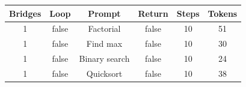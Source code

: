 \begin{table}[h]
\centering
\begin{tabular}{ |c|c|c|c|c|c| }
\hline
Bridges & Loop & Prompt & Return & Steps & Tokens \\
\hline
1 & false & Factorial & false & 10 & 51 \\
\hline
1 & false & Find max & false & 10 & 30 \\
\hline
1 & false & Binary search & false & 10 & 24 \\
\hline
1 & false & Quicksort & false & 10 & 38 \\
\hline
\end{tabular}
\end{table}

